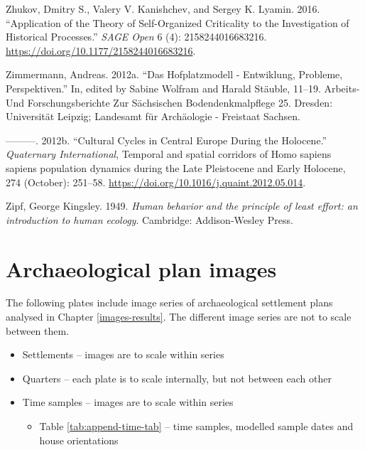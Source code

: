 \documentclass[
  12pt,
  a4paper, twoside]{book}
\providecommand{\tightlist}{%
  \setlength{\itemsep}{0pt}\setlength{\parskip}{0pt}}
\newlength{\cslhangindent}
\newlength{\cslentryspacingunit} %
\newenvironment{CSLReferences}[2] %
 {%
  \setlength{\parindent}{0pt}
  \ifodd #1
  \let\oldpar\par
  \def\par{\hangindent=\cslhangindent\oldpar}
  \fi
  \setlength{\parskip}{#2\cslentryspacingunit}
 }%
 {}
\begin{document}
\begin{CSLReferences}{1}{0}
\leavevmode{}%
Zhukov, Dmitry S., Valery V. Kanishchev, and Sergey K. Lyamin. 2016. {``Application of the {Theory} of {Self-Organized Criticality} to the {Investigation} of {Historical Processes}.''} \emph{SAGE Open} 6 (4): 2158244016683216. \url{https://doi.org/10.1177/2158244016683216}.

\leavevmode{}%
Zimmermann, Andreas. 2012a. {``Das Hofplatzmodell - Entwiklung, Probleme, Perspektiven.''} In, edited by Sabine Wolfram and Harald Stäuble, 11--19. Arbeits- Und Forschungsberichte Zur Sächsischen Bodendenkmalpflege 25. Dresden: Universität Leipzig; Landesamt für Archäologie - Freistaat Sachsen.

\leavevmode{}%
---------. 2012b. {``Cultural Cycles in {Central Europe} During the {Holocene}.''} \emph{Quaternary International}, Temporal and spatial corridors of {Homo} sapiens sapiens population dynamics during the {Late Pleistocene} and {Early Holocene}, 274 (October): 251--58. \url{https://doi.org/10.1016/j.quaint.2012.05.014}.

\leavevmode{}%
Zipf, George Kingsley. 1949. \emph{Human behavior and the principle of least effort: an introduction to human ecology}. Cambridge: Addison-Wesley Press.

\end{CSLReferences}

\hypertarget{appendix-appendix}{%
\appendix {}}


\hypertarget{append-archaeo}{%
\chapter{Archaeological plan images}\label{append-archaeo}}

The following plates include image series of archaeological settlement plans analysed in Chapter \ref{images-results}. The different image series are not to scale between them.

\begin{itemize}
\item
  Settlements -- images are to scale within series
\item
  Quarters -- each plate is to scale internally, but not between each other
\item
  Time samples -- images are to scale within series

  \begin{itemize}
  \tightlist
  \item
    Table \ref{tab:append-time-tab} -- time samples, modelled sample dates and house orientations
  \end{itemize}
\end{itemize}
\end{document}
